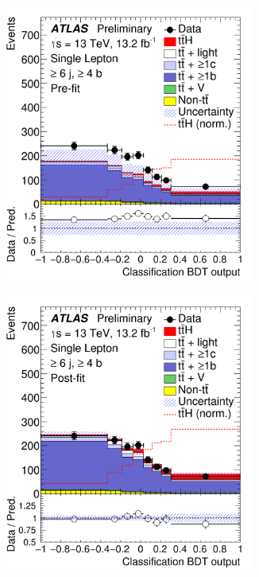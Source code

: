 \begin{figure}[htbp!]
\begin{subfigure}{0.24\textwidth}
  \caption{}
  \label{}
\end{subfigure}
\begin{center}
\begin{subfigure}{0.24\textwidth}
  \centering
  \includegraphics[width=0.9\textwidth]{figures/ttH/fig_11e.png}
  \caption{}
  \label{}
\end{subfigure}
\begin{subfigure}{0.24\textwidth}
  \centering
  \includegraphics[width=0.9\textwidth]{figures/ttH/fig_11f.png}
  \caption{}
  \label{}
\end{subfigure}
\end{center}



\end{figure}
